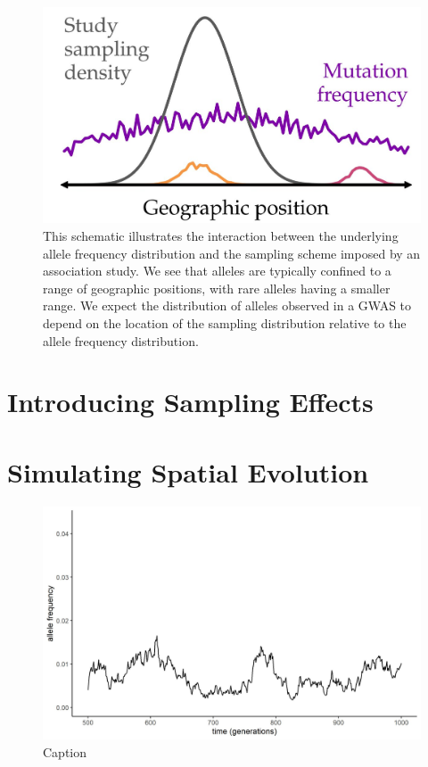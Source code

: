 \begin{figure}[h]
    \centering
    \includegraphics[scale=0.4]{img/smapling_schematic.JPG}
    \caption{This schematic illustrates the interaction between the underlying allele frequency distribution and the sampling scheme imposed by an association study. We see that alleles are typically confined to a range of geographic positions, with rare alleles having a smaller range. We expect the distribution of alleles observed in a GWAS to depend on the location of the sampling distribution relative to the allele frequency distribution.}
    \label{fig:sampling_schematic}
\end{figure}

\newpage
\section{Introducing Sampling Effects}




\newpage
\section{Simulating Spatial Evolution}

\begin{figure}[h]
    \centering
    \includegraphics{img/time_series.jpg}
    \caption{Caption}
    \label{fig:time_series}
\end{figure}





